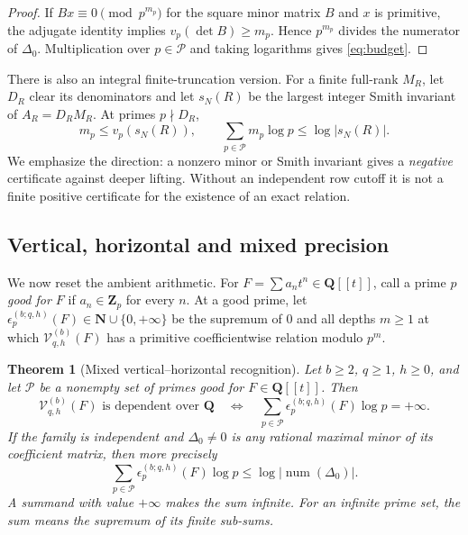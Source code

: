 \documentclass[11pt,reqno]{amsart}
\newtheorem{theorem}{Theorem}[section]
\theoremstyle{definition}
\theoremstyle{remark}
\newcommand{\N}{\mathbf N}
\newcommand{\Q}{\mathbf Q}
\newcommand{\Zp}{\mathbf Z_p}
\begin{document}
\begin{proof}
If $Bx\equiv0\pmod{p^{m_p}}$ for the square minor matrix $B$ and $x$ is
primitive, the adjugate identity implies
$v_p(\det B)\geq m_p$.  Hence $p^{m_p}$ divides the numerator of
$\Delta_0$.  Multiplication over $p\in\mathcal P$ and taking logarithms gives
\eqref{eq:budget}.
\end{proof}

There is also an integral finite-truncation version.  For a finite full-rank
$M_R$, let $D_R$ clear its denominators and let $s_N(R)$ be the largest
integer Smith invariant of $A_R=D_RM_R$.  At primes $p\nmid D_R$,
\begin{equation}\label{eq:finite-smith-budget}
 m_p\leq v_p(s_N(R)),\qquad
 \sum_{p\in\mathcal P}m_p\log p\leq\log|s_N(R)|.
\end{equation}
We emphasize the direction: a nonzero minor or Smith invariant gives a
\emph{negative} certificate against deeper lifting.  Without an independent
row cutoff it is not a finite positive certificate for the existence of an
exact relation.

\subsection{Vertical, horizontal and mixed precision}

We now reset the ambient arithmetic.  For $F=\sum a_nt^n\in\Q[[t]]$, call
a prime $p$ \emph{good for $F$} if $a_n\in\Zp$ for every $n$.  At a good
prime, let $\epsilon_p^{(b;q,h)}(F)\in\N\cup\{0,+\infty\}$ be the supremum
of $0$ and all depths $m\geq1$ at which $\mathcal V^{(b)}_{q,h}(F)$ has a
primitive coefficientwise relation modulo $p^m$.

\begin{theorem}[Mixed vertical--horizontal recognition]
\label{thm:mixed-profile}
Let $b\geq2$, $q\geq1$, $h\geq0$, and let $\mathcal P$ be a nonempty set
of primes good for $F\in\Q[[t]]$.  Then
\begin{equation}\label{eq:mixed-equivalence}
 \mathcal V^{(b)}_{q,h}(F)\text{ is dependent over }\Q
 \quad\Longleftrightarrow\quad
 \sum_{p\in\mathcal P}\epsilon_p^{(b;q,h)}(F)\log p=+\infty.
\end{equation}
If the family is independent and $\Delta_0\ne0$ is any rational maximal
minor of its coefficient matrix, then more precisely
\begin{equation}\label{eq:mixed-bound}
 \sum_{p\in\mathcal P}\epsilon_p^{(b;q,h)}(F)\log p
 \leq\log|\operatorname{num}(\Delta_0)|.
\end{equation}
A summand with value $+\infty$ makes the sum infinite.
For an infinite prime set, the sum means the supremum of its finite
sub-sums.
\end{theorem}
\end{document}
